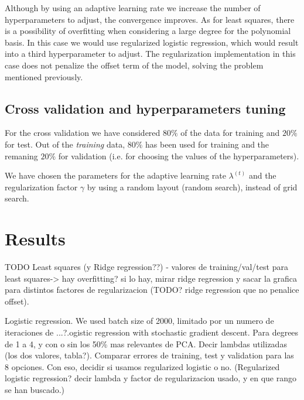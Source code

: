 \documentclass[10pt,conference,compsocconf]{IEEEtran}
\begin{document}
  Although by using an adaptive learning rate we increase the number of hyperparameters to adjust, the convergence improves.
  As for least squares, there is a possibility of overfitting when considering a large degree for the polynomial basis. In this case we would use regularized logistic regression, which would result into a third hyperparameter to adjust. The regularization implementation in this case does not penalize the offset term of the model, solving the problem mentioned previously.

\subsection{Cross validation and hyperparameters tuning} %
\label{sub:cross_validation_and_hyperparameters_tuning}
  For the cross validation we have considered $80\%$ of the data for training and $20\%$ for test. Out of the \emph{training} data, $80\%$ has been used for training and the remaning $20\%$ for validation (i.e. for choosing the values of the hyperparameters).

  We have chosen the parameters for the adaptive learning rate $\lambda^{(t)}$ and the regularization factor $\gamma$ by using a random layout (random search), instead of grid search.



\section{Results}
\label{sec:results}
TODO
Least squares (y Ridge regression??)
- valores de training/val/test para least squares-> hay overfitting?
si lo hay, mirar ridge regression y sacar la grafica para distintos factores de regularizacion (TODO? ridge regression que no penalice offset).

Logistic regression. We used batch size of 2000, limitado por un numero de iteraciones de ...?.ogistic regression with stochastic gradient descent.
Para degrees de 1 a 4, y con o sin los 50\% mas relevantes de PCA. Decir lambdas utilizadas (los dos valores, tabla?). Comparar errores de training, test y validation para las 8 opciones. Con eso, decidir si usamos regularized logistic o no.
(Regularized logistic regression? decir lambda y factor de regularizacion usado, y en que rango se han buscado.)
\end{document}
